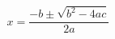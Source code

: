 \documentclass{article}
\begin{document}
\[
  x = \frac{-b \pm \sqrt{b^2 - 4ac}}{2a}
\]
\end{document}
